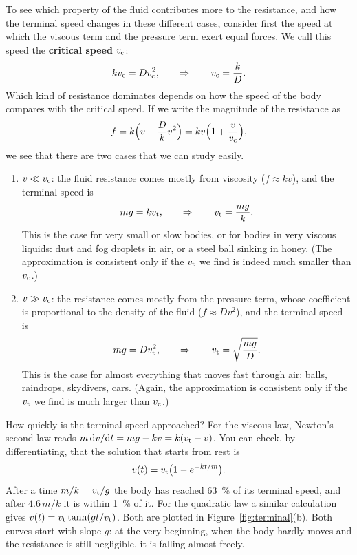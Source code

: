 \documentclass[11pt,a4paper]{article}
\begin{document}
To see which property of the fluid contributes more to the resistance, and how the terminal speed
changes in these different cases, consider first the speed at which the viscous term and the pressure
term exert equal forces. We call this speed the \textbf{critical speed} $v_{\mathrm{c}}$:
\begin{equation}\label{eq:vc}
  k v_{\mathrm{c}} = D v_{\mathrm{c}}^2 , \qquad \Rightarrow \qquad v_{\mathrm{c}} = \frac{k}{D} .
\end{equation}
Which kind of resistance dominates depends on how the speed of the body compares with the critical
speed. If we write the magnitude of the resistance as
\begin{equation}\label{eq:drag-vc}
  f = k\Bigl(v + \frac{D}{k} v^2\Bigr) = kv\Bigl(1 + \frac{v}{v_{\mathrm{c}}}\Bigr) ,
\end{equation}
we see that there are two cases that we can study easily.
\begin{enumerate}
  \item $v \ll v_{\mathrm{c}}$: the fluid resistance comes mostly from viscosity ($f \approx kv$), and the
    terminal speed is
    \begin{equation}\label{eq:vt-visc}
      mg = k v_{\mathrm{t}} , \qquad \Rightarrow \qquad v_{\mathrm{t}} = \frac{mg}{k} .
    \end{equation}
    This is the case for very small or slow bodies, or for bodies in very viscous liquids: dust and fog
    droplets in air, or a steel ball sinking in honey. (The approximation is consistent only if the
    $v_{\mathrm{t}}$ we find is indeed much smaller than $v_{\mathrm{c}}$.)
  \item $v \gg v_{\mathrm{c}}$: the resistance comes mostly from the pressure term, whose coefficient is
    proportional to the density of the fluid ($f \approx Dv^2$), and the terminal speed is
    \begin{equation}\label{eq:vt-press}
      mg = D v_{\mathrm{t}}^2 , \qquad \Rightarrow \qquad v_{\mathrm{t}} = \sqrt{\frac{mg}{D}} .
    \end{equation}
    This is the case for almost everything that moves fast through air: balls, raindrops, skydivers,
    cars. (Again, the approximation is consistent only if the $v_{\mathrm{t}}$ we find is much larger than
    $v_{\mathrm{c}}$.)
\end{enumerate}

How quickly is the terminal speed approached? For the viscous law, Newton's second law reads
$m\,\mathrm{d} v/\mathrm{d} t = mg - kv = k(v_{\mathrm{t}} - v)$. You can check, by differentiating, that the solution that
starts from rest is
\[
  v(t) = v_{\mathrm{t}}\bigl(1 - e^{-kt/m}\bigr) .
\]
After a time $m/k = v_{\mathrm{t}}/g$ the body has reached \qty{63}{\percent} of its terminal speed, and after
$4.6\,m/k$ it is within \qty{1}{\percent} of it. For the quadratic law a similar calculation gives
$v(t) = v_{\mathrm{t}}\tanh(gt/v_{\mathrm{t}})$. Both are plotted in Figure~\ref{fig:terminal}(b). Both curves start
with slope $g$: at the very beginning, when the body hardly moves and the resistance is still negligible, it is falling almost freely.
\end{document}
